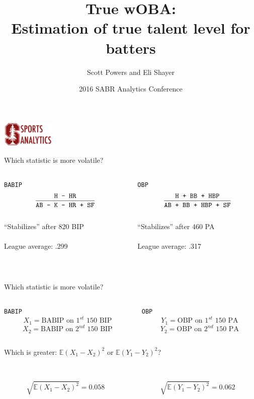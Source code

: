 \documentclass{beamer}
\title{True wOBA:\\
    \small Estimation of true talent level for batters}
\author{Scott Powers and Eli Shayer}
\institute{Stanford University}
\date{2016 SABR Analytics Conference}
\def\mE{\mathbb E}\def\mN{\mathbb N}\def\mP{\mathbb P}\def\mR{\mathbb R}
\begin{document}
\begin{frame}
\titlepage
\hfill\includegraphics[width = 1in]{../figs/ssac.png}
\end{frame}

\begin{frame}{Which statistic is more volatile?}
\begin{columns}
\begin{column}{0.5\textwidth}
\centering
{\Huge\tt BABIP}\\
$$\frac{\mbox{\tt H - HR}}{\mbox{\tt AB - K - HR + SF}}$$
~\\
\vspace{4mm}
``Stabilizes'' after 820 BIP\\
~\\
League average: .299
\end{column}
\begin{column}{0.5\textwidth}
\centering
{\Huge\tt OBP}\\
$$\frac{\mbox{\tt H + BB + HBP}}{\mbox{\tt AB + BB + HBP + SF}}$$
~\\
\vspace{4mm}
``Stabilizes'' after 460 PA\\
~\\
League average: .317
\end{column}
\end{columns}
\vspace{6.5mm}
~\\
\end{frame}

\begin{frame}{Which statistic is more volatile?}
\begin{columns}
\begin{column}{0.5\textwidth}
\centering
{\Huge\tt BABIP}\\
$$X_1 = \mbox{BABIP on $1^{st}$ 150 BIP}$$
$$X_2 = \mbox{BABIP on $2^{nd}$ 150 BIP}$$
\end{column}
\begin{column}{0.5\textwidth}
\centering
{\Huge\tt OBP}\\
$$Y_1 = \mbox{OBP on $1^{st}$ 150 PA}$$
$$Y_2 = \mbox{OBP on $2^{nd}$ 150 PA}$$
\end{column}
\end{columns}
\centering
\vspace{1cm}
Which is greater: $\mE(X_1 - X_2)^2$ or $\mE(Y_1 - Y_2)^2$?\\
~\\
\begin{columns}
\begin{column}{0.5\textwidth}
\pause
$$\sqrt{\mE(X_1 - X_2)^2} = 0.058$$
\end{column}
\begin{column}{0.5\textwidth}
\pause
$$\sqrt{\mE(Y_1 - Y_2)^2} = 0.062$$
\end{column}
\end{columns}
\end{frame}
\end{document}
